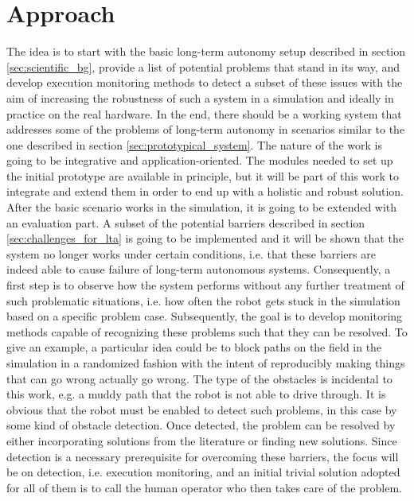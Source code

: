\documentclass[english, master, expose, utf8]{base/thesis_KBS}
\begin{document}
\section{Approach}

The idea is to start with the basic long-term autonomy setup described in section \ref{sec:scientific_bg}, provide a list of potential problems that 
stand in its way, and develop execution monitoring methods to detect a subset of these issues with the aim of increasing the robustness of such a system in a simulation
and ideally in practice on the real hardware. In the end, there should be a working system that addresses some of the problems of long-term autonomy 
in scenarios similar to the one described in section \ref{sec:prototypical_system}. The nature of the work is going to be integrative and application-oriented. The modules 
needed to set up the initial prototype are available in principle, but it will be part of this work to integrate and extend them in order to end up with a holistic and robust
solution. After the basic scenario works in the simulation, it is going to be extended with an evaluation part. A subset of the potential barriers described in section 
\ref{sec:challenges_for_lta} is going to be implemented and it will be shown that the system no longer works under certain conditions, i.e. that these
barriers are indeed able to cause failure of long-term autonomous systems. Consequently, a first step is to observe how the system performs without any further 
treatment of such problematic situations, i.e. how often the robot gets stuck in the simulation based on a specific problem case.
Subsequently, the goal is to develop monitoring methods capable of recognizing these problems such that they can be resolved.
To give an example, a particular idea could be to block paths on the field in the simulation in a randomized fashion with the intent of reproducibly making things that 
can go wrong actually go wrong. The type of the obstacles is incidental to this work, e.g. a muddy path that the robot is not able to drive through. 
It is obvious that the robot must be enabled to detect such problems, in this case by some kind of obstacle detection.
Once detected, the problem can be resolved by either incorporating solutions from the literature or finding new solutions.
Since detection is a necessary prerequisite for overcoming these barriers, the focus will be on detection, i.e. execution monitoring,
and an initial trivial solution adopted for all of them is to call the human operator who then takes care of the problem.\newline
\end{document}
